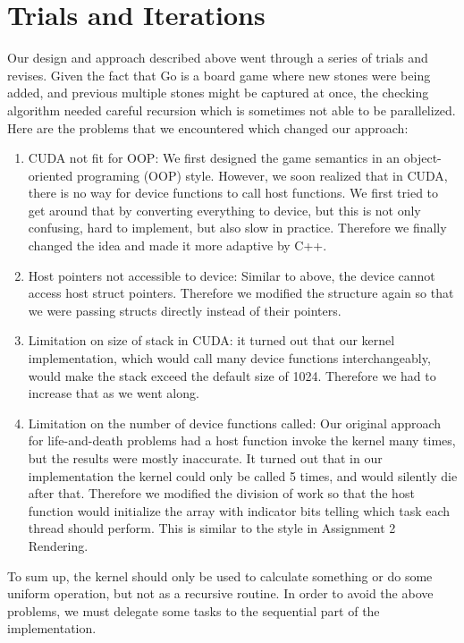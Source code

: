 \documentclass[11pt]{article}
\begin{document}
\section*{Trials and Iterations}
Our design and approach described above went through a series of trials and revises. Given the fact that Go is a board game where new stones were being added, and previous multiple stones might be captured at once, the checking algorithm needed careful recursion which is sometimes not able to be parallelized. Here are the problems that we encountered which changed our approach:
\begin{enumerate}
\item CUDA not fit for OOP: We first designed the game semantics in an object-oriented programing (OOP) style. However, we soon realized that in CUDA, there is no way for device functions to call host functions. We first tried to get around that by converting everything to device, but this is not only confusing, hard to implement, but also slow in practice. Therefore we finally changed the idea and made it more adaptive by C++.
\item Host pointers not accessible to device: Similar to above, the device cannot access host struct pointers. Therefore we modified the structure again so that we were passing structs directly instead of their pointers. 
\item Limitation on size of stack in CUDA: it turned out that our kernel implementation, which would call many device functions interchangeably, would  make the stack exceed the default size of 1024. Therefore we had to increase that as we went along. 
\item Limitation on the number of device functions called: Our original approach for life-and-death problems had a host function invoke the kernel many times, but the results were mostly inaccurate. It turned out that in our implementation the kernel could only be called 5 times, and would silently die after that. Therefore we modified the division of work so that the host function would initialize the array with indicator bits telling which task each thread should perform. This is similar to the style in Assignment 2 Rendering. 
\end{enumerate}
To sum up, the kernel should only be used to calculate something or do some uniform operation, but not as a recursive routine. In order to avoid the above problems, we must delegate some tasks to the sequential part of the implementation.\\
\end{document}
